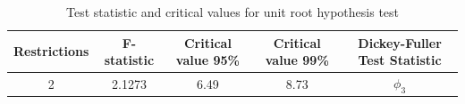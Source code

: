 \begin{table}[h]

\caption{\label{tab:df_test_table}Test statistic and critical values for unit root hypothesis test}
\centering
\begin{tabular}[t]{ccccc}
\toprule
Restrictions & F-statistic & Critical value 95\% & Critical value 99\% & Dickey-Fuller Test Statistic\\
\midrule
2 & 2.1273 & 6.49 & 8.73 & $\phi_3$\\
\bottomrule
\end{tabular}
\end{table}
